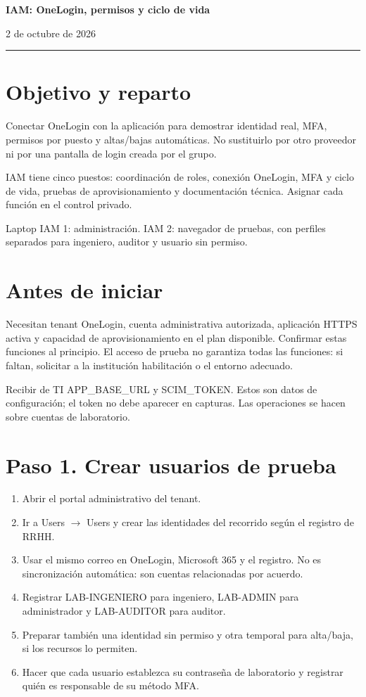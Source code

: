 \documentclass[12pt,a4paper]{article}
\begin{document}
{\LARGE\bfseries IAM: OneLogin, permisos y ciclo de vida\par}\vspace{6pt}
2 de octubre de 2026\par\hrule\vspace{10pt}
\section*{Objetivo y reparto}
Conectar OneLogin con la aplicación para demostrar identidad real, MFA, permisos por puesto y altas/bajas automáticas. No sustituirlo por otro proveedor ni por una pantalla de login creada por el grupo.\par
IAM tiene cinco puestos: coordinación de roles, conexión OneLogin, MFA y ciclo de vida, pruebas de aprovisionamiento y documentación técnica. Asignar cada función en el control privado.\par
Laptop IAM 1: administración. IAM 2: navegador de pruebas, con perfiles separados para ingeniero, auditor y usuario sin permiso.\par
{}\section*{Antes de iniciar}
Necesitan tenant OneLogin, cuenta administrativa autorizada, aplicación HTTPS activa y capacidad de aprovisionamiento en el plan disponible. Confirmar estas funciones al principio. El acceso de prueba no garantiza todas las funciones: si faltan, solicitar a la institución habilitación o el entorno adecuado.\par
Recibir de TI APP\_BASE\_URL y SCIM\_TOKEN. Estos son datos de configuración; el token no debe aparecer en capturas. Las operaciones se hacen sobre cuentas de laboratorio.\par
{}\section*{Paso 1. Crear usuarios de prueba}
\begin{enumerate}
\item Abrir el portal administrativo del tenant.
\item Ir a Users \(\rightarrow\) Users y crear las identidades del recorrido según el registro de RRHH.
\item Usar el mismo correo en OneLogin, Microsoft 365 y el registro. No es sincronización automática: son cuentas relacionadas por acuerdo.
\item Registrar LAB-INGENIERO para ingeniero, LAB-ADMIN para administrador y LAB-AUDITOR para auditor.
\item Preparar también una identidad sin permiso y otra temporal para alta/baja, si los recursos lo permiten.
\item Hacer que cada usuario establezca su contraseña de laboratorio y registrar quién es responsable de su método MFA.
\end{enumerate}
\end{document}
